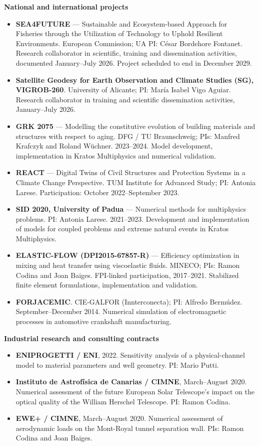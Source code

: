 \documentclass[a4paper,11pt]{article}
\newcommand{\cvsection}[1]{\par\vspace{8pt}{\large\bfseries\color{heading}#1}\par\vspace{3pt}}
\begin{document}
\cvsection{Participation in research projects}
\textbf{National and international projects}
\begin{itemize}
\item \textbf{SEA4FUTURE} --- Sustainable and Ecosystem-based Approach for Fisheries through the Utilization of Technology to Uphold Resilient Environments. European Commission; UA PI: César Bordehore Fontanet. Research collaborator in scientific, training and dissemination activities, documented January--July 2026. Project scheduled to end in December 2029.
\item \textbf{Satellite Geodesy for Earth Observation and Climate Studies (SG), VIGROB-260}. University of Alicante; PI: María Isabel Vigo Aguiar. Research collaborator in training and scientific dissemination activities, January--July 2026.
\item \textbf{GRK 2075} --- Modelling the constitutive evolution of building materials and structures with respect to aging. DFG / TU Braunschweig; PIs: Manfred Krafczyk and Roland Wüchner. 2023--2024. Model development, implementation in Kratos Multiphysics and numerical validation.
\item \textbf{REACT} --- Digital Twins of Civil Structures and Protection Systems in a Climate Change Perspective. TUM Institute for Advanced Study; PI: Antonia Larese. Participation: October 2022--September 2023.
\item \textbf{SID 2020, University of Padua} --- Numerical methods for multiphysics problems. PI: Antonia Larese. 2021--2023. Development and implementation of models for coupled problems and extreme natural events in Kratos Multiphysics.
\item \textbf{ELASTIC-FLOW (DPI2015-67857-R)} --- Efficiency optimization in mixing and heat transfer using viscoelastic fluids. MINECO; PIs: Ramon Codina and Joan Baiges. FPI-linked participation, 2017--2021. Stabilized finite element formulations, implementation and validation.
\item \textbf{FORJACEMIC}. CIE-GALFOR (Innterconecta); PI: Alfredo Bermúdez. September--December 2014. Numerical simulation of electromagnetic processes in automotive crankshaft manufacturing.
\end{itemize}
\textbf{Industrial research and consulting contracts}
\begin{itemize}
\item \textbf{ENIPROGETTI / ENI}, 2022. Sensitivity analysis of a physical-channel model to material parameters and well geometry. PI: Mario Putti.
\item \textbf{Instituto de Astrofísica de Canarias / CIMNE}, March--August 2020. Numerical assessment of the future European Solar Telescope's impact on the optical quality of the William Herschel Telescope. PI: Ramon Codina.
\item \textbf{EWE+ / CIMNE}, March--August 2020. Numerical assessment of aerodynamic loads on the Mont-Royal tunnel separation wall. PIs: Ramon Codina and Joan Baiges.
\end{itemize}
\end{document}
